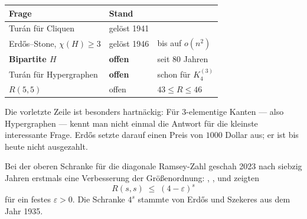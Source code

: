 \begin{forschung}
\begin{center}
{\small
\renewcommand{\arraystretch}{1.45}
\begin{tabular}{@{}P{3.0cm}P{2.4cm}P{2.8cm}@{}}
\toprule
\textbf{Frage} & \textbf{Stand} & \\
\midrule
Turán für Cliquen & \textcolor{gruen}{gelöst 1941} & \\
Erdős--Stone, $\chi(H)\ge3$ & \textcolor{gruen}{gelöst 1946} & bis auf $o(n^2)$\\
\textbf{Bipartite $H$} & \textcolor{akzent}{\textbf{offen}} & seit $80$ Jahren\\
Turán für Hypergraphen & \textcolor{akzent}{\textbf{offen}} & schon für $K_4^{(3)}$\\
$R(5,5)$ & \textcolor{akzent}{offen} & $43 \le R \le 46$\\
\bottomrule
\end{tabular}}
\end{center}

Die vorletzte Zeile ist besonders hartnäckig: Für $3$-elementige Kanten --- also Hypergraphen --- kennt man nicht einmal die Antwort für die kleinste interessante Frage. Erdős setzte darauf einen Preis von $1000$ Dollar aus; er ist bis heute nicht ausgezahlt.

Bei der oberen Schranke für die diagonale Ramsey-Zahl geschah 2023 nach siebzig Jahren erstmals eine Verbesserung der Größenordnung: , ,  und  zeigten
\[ R(s,s) \;\le\; (4-\varepsilon)^s \]
für ein festes $\varepsilon > 0$. Die Schranke $4^s$ stammte von Erdős und Szekeres aus dem Jahr 1935.

\begin{center}
\begin{minipage}{0.88\textwidth}
\end{minipage}
\end{center}
\end{forschung}


